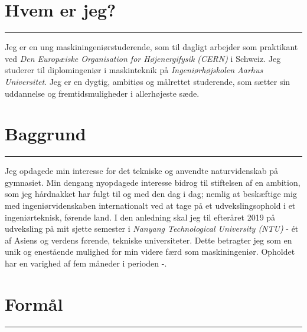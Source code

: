 \documentclass[../Ansoegning.tex]{subfiles}
\begin{document}
\section*{Hvem er jeg?}\vspace{-2.7mm}
\rule{0.7\textwidth}{0.5pt}\vspace{\VRuleDistSmall}

Jeg er en ung maskiningeniørstuderende, som til dagligt arbejder som praktikant ved \textit{Den Europæiske Organisation for Højenergifysik (CERN)} i Schweiz. Jeg studerer til diplomingeniør i maskinteknik på \textit{Ingeniørhøjskolen Aarhus Universitet}. Jeg er en dygtig, ambitiøs og målrettet studerende, som sætter sin uddannelse og fremtidsmuligheder i allerhøjeste sæde. \vspace{\VSecSpace}
\section*{Baggrund}\vspace{-3mm}
\rule{1\textwidth}{0.5pt}\vspace{\VRuleDistSmall}

Jeg opdagede min interesse for det tekniske og anvendte naturvidenskab på gymnasiet. Min dengang nyopdagede interesse bidrog til stiftelsen af en ambition, som jeg hårdnakket har fulgt til og med den dag i dag; nemlig at beskæftige mig med ingeniørvidenskaben internationalt ved at tage på et udvekslingsophold i et ingeniørteknisk, førende land. I den anledning skal jeg til efteråret 2019 på udveksling på mit sjette semester i \textit{Nanyang Technological University (NTU)} - ét af Asiens og verdens førende, tekniske universiteter. Dette betragter jeg som en unik og enestående mulighed for min videre færd som maskiningeniør. Opholdet har en varighed af fem måneder i perioden {\Fra-\Till}. \vspace{-11mm}
\section*{Formål}\vspace{-3mm}
\rule{1\textwidth}{0.5pt}\vspace{\VRuleDistSmall}
\end{document}
